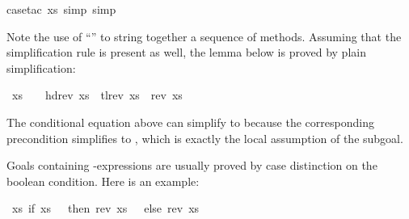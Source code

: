 \begin{isabellebody}
%
\isadelimproof
%
\endisadelimproof
%
\isatagproof
{}\isamarkupfalse%
{\isacharparenleft}case{\isacharunderscore}tac\ xs{\isacharcomma}\ simp{\isacharcomma}\ simp{\isacharparenright}\isanewline
{}\isamarkupfalse%
%
\endisatagproof
{\isafoldproof}%
%
\isadelimproof
%
\endisadelimproof
%
\begin{isamarkuptext}%
\noindent
Note the use of ``'' to string together a
sequence of methods. Assuming that the simplification rule
is present as well,
the lemma below is proved by plain simplification:%
\end{isamarkuptext}%
\isamarkuptrue%
\isamarkupfalse%
\ {\isachardoublequoteopen}xs\ {\isasymnoteq}\ {\isacharbrackleft}{\isacharbrackright}\ {\isasymLongrightarrow}\ hd{\isacharparenleft}rev\ xs{\isacharparenright}\ {\isacharhash}\ tl{\isacharparenleft}rev\ xs{\isacharparenright}\ {\isacharequal}\ rev\ xs{\isachardoublequoteclose}%
\isadelimproof
%
\endisadelimproof
%
\isatagproof
%
\endisatagproof
{\isafoldproof}%
%
\isadelimproof
%
\endisadelimproof
%
\begin{isamarkuptext}%
\noindent
The conditional equation  above
can simplify  to 
because the corresponding precondition 
simplifies to , which is exactly the local
assumption of the subgoal.%
\end{isamarkuptext}%
\isamarkuptrue%
%
\isamarkuptrue%
%
\begin{isamarkuptext}%
\label{sec:AutoCaseSplits}%
Goals containing -expressions
are usually proved by case
distinction on the boolean condition.  Here is an example:%
\end{isamarkuptext}%
\isamarkuptrue%
\isamarkupfalse%
\ {\isachardoublequoteopen}{\isasymforall}xs{\isachardot}\ if\ xs\ {\isacharequal}\ {\isacharbrackleft}{\isacharbrackright}\ then\ rev\ xs\ {\isacharequal}\ {\isacharbrackleft}{\isacharbrackright}\ else\ rev\ xs\ {\isasymnoteq}\ {\isacharbrackleft}{\isacharbrackright}{\isachardoublequoteclose}%

\end{isabellebody}
